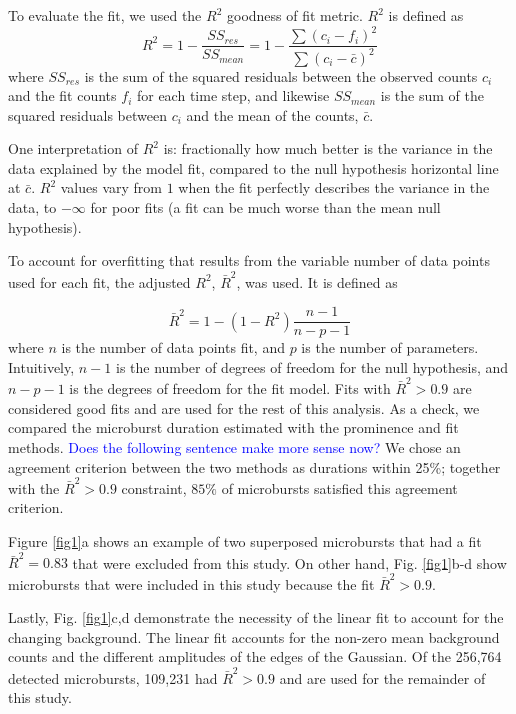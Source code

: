 \documentclass[draft]{agujournal2019}
\begin{document}
To evaluate the fit, we used the $R^2$ goodness of fit metric. $R^2$ is defined as
\begin{equation}
R^2 = 1 - \frac{SS_{res}}{SS_{mean}} = 1 - \frac{\sum{(c_i-f_i)^2}}{\sum{(c_i-\bar{c})^2}}
\end{equation} where $SS_{res}$ is the sum of the squared residuals between the observed counts $c_i$ and the fit counts $f_i$ for each time step, and likewise $SS_{mean}$ is the sum of the squared residuals between $c_i$ and the mean of the counts, $\bar{c}$.

One interpretation of $R^2$ is: fractionally how much better is the variance in the data explained by the model fit, compared to the null hypothesis horizontal line at $\bar{c}$. $R^2$ values vary from $1$ when the fit perfectly describes the variance in the data, to $-\infty$ for poor fits (a fit can be much worse than the mean null hypothesis).

To account for overfitting that results from the variable number of data points used for each fit, the adjusted $R^2$, $\bar{R}^2$, was used. It is defined as

\begin{equation}
\bar{R}^2 = 1 - (1-R^2) \frac{n-1}{n-p-1}
\end{equation} where $n$ is the number of data points fit, and $p$ is the number of parameters. Intuitively, $n-1$ is the number of degrees of freedom for the null hypothesis, and $n-p-1$ is the degrees of freedom for the fit model. Fits with $\bar{R}^2 > 0.9$ are considered good fits and are used for the rest of this analysis. As a check, we compared the microburst duration estimated with the prominence and fit methods. \textcolor{blue}{Does the following sentence make more sense now?} We chose an agreement criterion between the two methods as durations within 25\%; together with the $\bar{R}^2 > 0.9$ constraint, $85\%$ of microbursts satisfied this agreement criterion.

Figure \ref{fig1}a shows an example of two superposed microbursts that had a fit $\bar{R}^2 = 0.83$ that were excluded from this study. On other hand, Fig. \ref{fig1}b-d show microbursts that were included in this study because the fit $\bar{R}^2 > 0.9$.

Lastly, Fig. \ref{fig1}c,d demonstrate the necessity of the linear fit to account for the changing background. The linear fit accounts for the non-zero mean background counts and the different amplitudes of the edges of the Gaussian. Of the 256,764 detected microbursts, 109,231 had $\bar{R}^2 > 0.9$ and are used for the remainder of this study.
\end{document}
